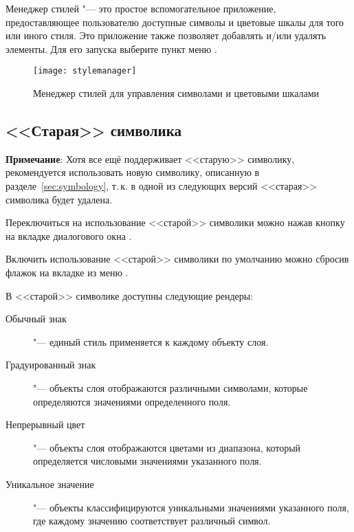 Менеджер стилей "--- это простое вспомогательное приложение, предоставляющее
пользователю доступные символы и цветовые шкалы для того или иного стиля.
Это приложение также позволяет добавлять и/или удалять элементы. Для его
запуска выберите пункт меню  \arrow
{}.

\begin{figure}[ht]
   \centering
   \texttt{[image: stylemanager]}
   \caption{Менеджер стилей для управления символами и цветовыми шкалами \wincaption}\label{fig:stylemanager}
\end{figure}

\subsection{<<Старая>> символика}\label{sec:oldsymbology}

\textbf{Примечание}: Хотя  все ещё поддерживает <<старую>> символику,
рекомендуется использовать новую символику, описанную в разделе~\ref{sec:symbology},
т.\,к. в одной из следующих версий <<старая>> символика будет удалена.

Переключиться на использование <<старой>> символики можно нажав кнопку
 на вкладке  диалогового окна
.

Включить использование <<старой>> символики по умолчанию можно сбросив
флажок 
на вкладке  из меню  \arrow
{}.

В <<старой>> символике доступны следующие рендеры:

\begin{description}
\item[Обычный знак] "--- единый стиль применяется к каждому
объекту слоя.
\item[Градуированный знак] "--- объекты слоя
отображаются различными символами, которые определяются значениями
определенного поля.
\item[Непрерывный цвет] "--- объекты слоя отображаются цветами из
диапазона, который определяется числовыми значениями указанного поля.
\item[Уникальное значение] "--- объекты классифицируются уникальными
значениями указанного поля, где каждому значению соответствует
различный символ.
\end{description}

